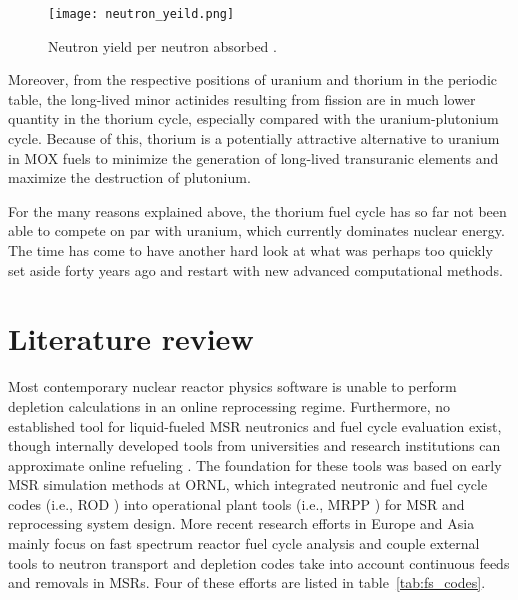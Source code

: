 \begin{figure}[htbp!] %
  \centering
  \vspace{-0.3em}
  \texttt{[image: neutron\_yeild.png]}
  \caption{Neutron yield per neutron absorbed \cite{anon_plutonium_1989}.}
  \vspace{-1.1em}
  \label{fig:n_yeild}
\end{figure}
\FloatBarrier

Moreover, from the respective positions of uranium and thorium in the periodic table, the long-lived minor actinides resulting from fission are in much lower quantity in the thorium cycle, especially compared with the uranium-plutonium cycle. Because of this, thorium is a potentially attractive alternative to uranium in \gls{MOX} fuels to minimize the generation of long-lived transuranic elements and maximize the destruction of plutonium.

For the many reasons explained above, the thorium fuel cycle has so far not been able to compete on par with uranium, which currently dominates nuclear energy. The time has come to have another hard look at what was perhaps too quickly set aside forty years ago and restart with new advanced computational methods. 

\section{Literature review}
Most contemporary nuclear reactor physics software is unable to perform depletion calculations in an online reprocessing regime. Furthermore, no established tool for liquid-fueled \gls{MSR} neutronics and fuel cycle evaluation exist, though internally developed tools from universities and research institutions can approximate online refueling \cite{serp_molten_2014}. The foundation for these tools was based on early \gls{MSR} simulation methods at \gls{ORNL}, which integrated neutronic and fuel cycle codes (i.e., ROD \cite{bauman_rod:_1971}) into operational plant tools (i.e., MRPP \cite{kee_mrpp:_1976}) for \gls{MSR} and reprocessing system design. More recent research efforts in Europe and Asia mainly focus on fast spectrum reactor fuel cycle analysis and couple external tools to neutron transport and depletion codes take into account continuous feeds and removals in \glspl{MSR}. Four of these efforts are listed in table~\ref{tab:fs_codes}.

